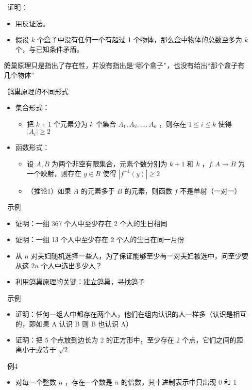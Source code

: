 \documentclass[UTF8]{report}
\theoremstyle{MyLineTheoremStyle} %
\theoremstyle{MyBlockTheoremStyle} %
\theoremstyle{MySubsubsectionStyle} %
\begin{document}
\textbullet\ 证明：
\begin{itemize}
    \item 用反证法。
    \item 假设 $k$ 个盒子中没有任何一个有超过 1 个物体，那么盒中物体的总数至多为 $k$ 个，与已知条件矛盾。
\end{itemize}
鸽巢原理只是指出了存在性，并没有指出是“哪个盒子”，也没有给出“那个盒子有几个物体”

\textbullet\ 鸽巢原理的不同形式
\begin{itemize}
    \item 集合形式：
    \begin{itemize}
        \item 把 $k + 1$ 个元素分为 $k$ 个集合 $A_1, A_2, \ldots , A_k$ ，则存在 $1 \leq i \leq k$ 使得 $|A_i| \geq 2$
    \end{itemize}
    \item 函数形式：
    \begin{itemize}
        \item 设 $A, B$ 为两个非空有限集合，元素个数分别为 $k + 1$ 和 $k$ ，$f: A \to B$ 为一个映射，则存在 $y \in B$ 使得 $|f^{-1}(y)| \geq 2$
        \item （推论1）如果 $A$ 的元素多于 $B$ 的元素，则函数 $f$ 不是单射（一对一）
    \end{itemize}
\end{itemize}

\textbullet\ 示例
\begin{itemize}
    \item 证明：一组 367 个人中至少存在 2 个人的生日相同
    \item 证明：一组 13 个人中至少存在 2 个人的生日在同一月份
    \item 从 $n$ 对夫妇随机选择一些人，为了保证能够至少有一对夫妇被选中，问至少要从这 $2n$ 个人中选出多少人？
    \item 利用鸽巢原理的关键：建立鸽巢，寻找鸽子
\end{itemize}

\textbullet\ 示例
\begin{itemize}
    \item 证明：任何一组人中都存在两个人，他们在组内认识的人一样多（认识是相互的，即如果 A 认识 B 则 B 也认识 A）
    \item 证明：把 5 个点放到边长为 2 的正方形中，至少存在 2 个点，它们之间的距离小于或等于 $\sqrt{2} $
\end{itemize}

\textbullet\ 例4
\begin{itemize}
    \item 对每一个整数 $n$ ，存在一个数是 $n$ 的倍数，其十进制表示中只出现 0 和 1
\end{itemize}
\end{document}
